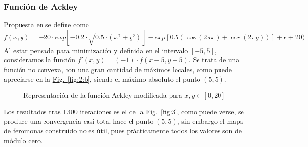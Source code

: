 \documentclass[runningheads]{llncs}
\newcommand{\refcruzada}[2]{\hyperref[#2]{#1~\ref{#2}}}
\begin{document}
    \subsubsection{Función de Ackley} Propuesta en \cite{AckleyFunction} se define como
    \[ f(x,y)=-20 \cdot exp[-0.2 \cdot \sqrt{0.5 \cdot (x^2 + y^2)}] - exp[0.5 ( \cos(2 \pi x)
    + \cos(2 \pi y))] + e + 20)\]
    Al estar pensada para minimización y definida en el intervalo $[-5,5]$, consideramos la función $f'(x,y)=(-1)\cdot f(x-5, y-5)$. Se trata de una función no convexa, con una gran cantidad de máximos locales, como puede apreciarse en la \refcruzada{Fig.}{fig:2:b}, siendo el máximo absoluto el punto $(5,5)$.
    
    \begin{figure}[htbp]
    	\centering
    	\caption{Representación de la función Ackley modificada para $x,y\in[0,20]$}
    \end{figure}
    
    Los resultados tras 1\,300 iteraciones es el de la \refcruzada{Fig.}{fig:3}, como puede verse, se produce una convergencia casi total hace el punto $(5,5)$, sin embargo el mapa de feromonas construido no es útil, pues prácticamente todos los valores son de módulo cero.
\end{document}
